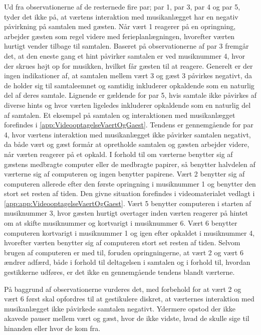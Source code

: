 Ud fra observationerne af de resternede fire par; par 1, par 3, par 4 og par 5, tyder det ikke på, at værtens interaktion med musikanlægget har en negativ påvirkning på samtalen med gæsten. Når vært 1 reagerer på en opringning, arbejder gæsten som regel videre med ferieplanlægningen, hvorefter værten hurtigt vender tilbage til samtalen. Baseret på observationerne af par 3 fremgår det, at den eneste gang et hint påvirker samtalen er ved musiknummer 4, hvor der skrues højt op for musikken, hvilket får gæsten til at reagere. Generelt er der ingen indikationer af, at samtalen mellem vært 3 og gæst 3 påvirkes negativt, da de holder sig til samtaleemnet og samtidig inkluderer opkaldende som en naturlig del af deres samtale. Lignende er gældende for par 5, hvis samtale ikke påvirkes af diverse hints og hvor værten ligeledes inkluderer opkaldende som en naturlig del af samtalen. Et eksempel på samtalen og interaktionen med musikanlægget forefindes i \autoref{app:VideooptagelseVaertOgGaest}. Tendens er gennemgående for par 4, hvor værtens interaktion med musikanlægget ikke påvirker samtalen negativt, da både vært og gæst formår at opretholde samtalen og gæsten arbejder videre, når værten reagerer på et opkald. \blankline
%
I forhold til om værterne benytter sig af gæstens medbragte computer eller de medbragte papirer, så benytter halvdelen af værterne sig af computeren og ingen benytter papirene. Vært 2 benytter sig af computeren allerede efter den første opringning i musiknummer 1 og benytter den stort set resten af tiden. Den givne situation forefindes i videomaterialet vedlagt i \autoref{app:app:VideooptagelseVaertOgGaest}. Vært 5 benytter computeren i starten af musiknummer 3, hvor gæsten hurtigt overtager inden værten reagerer på hintet om at skifte musiknummer og kortvarigt i musiknummer 6. Vært 6 benytter computeren kortvarigt i musiknummer 1 og igen efter opkaldet i musiknummer 4, hvorefter værten benytter sig af computeren stort set resten af tiden. Selvom brugen af computeren er med til, foruden opringningerne, at vært 2 og vært 6 ændrer adfærd, både i forhold til deltagelsen i samtalen og i forhold til, hvordan gestikkerne udføres, er det ikke en gennemgående tendens blandt værterne.   

På baggrund af observationerne vurderes det, med forbehold for at vært 2 og vært 6 først skal opfordres til at gestikulere diskret, at værternes interaktion med musikanlægget ikke påvirkede samtalen negativt. Ydermere opstod der ikke akavede pauser mellem vært og gæst, hvor de ikke vidste, hvad de skulle sige til hinanden eller hvor de kom fra. 

